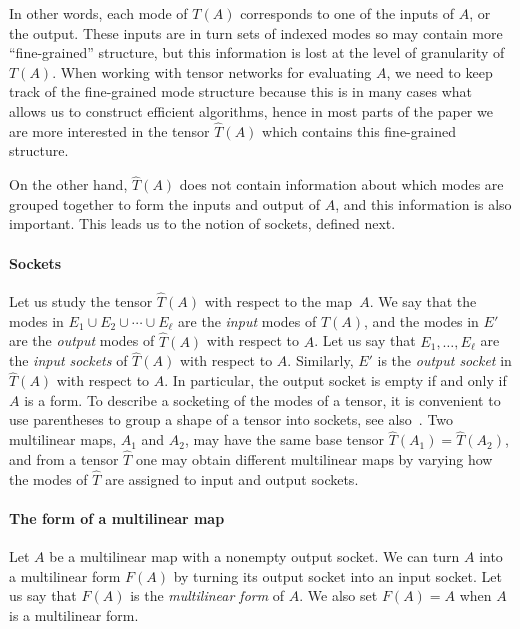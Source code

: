 In other words, each mode of $T(A)$ corresponds to one of the inputs
of $A$, or the output.  These inputs are in turn sets of indexed modes
so may contain more ``fine-grained'' structure, but this information
is lost at the level of granularity of $T(A)$.  When working with
tensor networks for evaluating $A$, we need to keep track of the
fine-grained mode structure because this is in many cases what allows
us to construct efficient algorithms, hence in most parts of the paper
we are more interested in the tensor $\hat{T}(A)$ which contains this
fine-grained structure.

On the other hand, $\hat{T}(A)$ does not contain information about
which modes are grouped together to form the inputs and output of $A$,
and this information is also important.  This leads us to the notion
of sockets, defined next.

\paragraph*{Sockets}

Let us study the tensor $\hat{T}(A)$ with respect to the map~$A$.
We say that the modes in
$E_1\cup E_2\cup\cdots\cup E_\ell$ %
are the \emph{input} modes of $\hat{T}(A)$,
and the modes in $E'$ are the \emph{output} modes of $\hat{T}(A)$ with respect to $A$.
Let us say that $E_1, \ldots, E_\ell$ are the
\emph{input sockets} of $\hat{T}(A)$ with respect to $A$. Similarly,
$E'$ is the \emph{output socket} in $\hat{T}(A)$ with respect to $A$.
In particular, the output socket is empty if and only if $A$ is a form. To describe a socketing of the modes of a tensor, it is convenient to
use parentheses to group a 
%
%
%
shape of a tensor
into sockets, see also~.
%
Two multilinear maps, $A_1$ and $A_2$, %
may have the same base tensor $\hat{T}(A_1)=\hat{T}(A_2)$, and from a tensor $\hat{T}$ one may
obtain different multilinear maps by varying how the modes of $\hat{T}$
are assigned to input and output sockets.

\paragraph*{The form of a multilinear map}

Let $A$ be a multilinear map with a nonempty output socket.
We can turn $A$ into a multilinear form $F(A)$ by turning
its output socket into an input socket.
Let us say that $F(A)$ is the \emph{multilinear form} of $A$.
We also set $F(A)=A$ when $A$ is a multilinear form.

